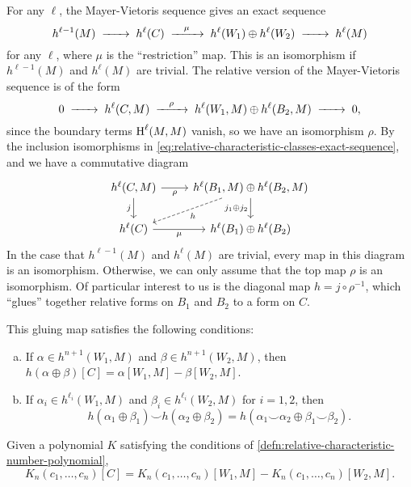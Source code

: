For any $\ell$, the Mayer-Vietoris sequence gives an exact sequence
\[
	h^{\ell-1}(M)\lkxto h^{\ell}(C) \lkxto[\mu] h^{\ell}(W_1)\oplus h^{\ell}(W_2) \lkxto h^{\ell}(M)
\]
for any $\ell$, where $\mu$ is the ``restriction'' map. This is an isomorphism if $h^{\ell-1}(M)$ and $h^\ell(M)$ are trivial.
The relative version of the Mayer-Vietoris sequence is of the form
\[
	0 \lkxto h^{\ell}(C, M) \lkxto[\rho] h^{\ell}(W_1,M)\oplus h^{\ell}(B_2,M) \lkxto 0,
\]
since the boundary terms $\operatorname{H}^\ell(M,M)$ vanish, so we have an isomorphism $\rho$.
By the inclusion isomorphisms in \cref{eq:relative-characteristic-classes-exact-sequence}, and we have a commutative diagram
\[
	\begin{tikzcd}
		{h^{\ell}(C,M)} & {h^{\ell}(B_1,M)\oplus h^{\ell}(B_2,M)} \\
		{h^{\ell}(C)} & {h^{\ell}(B_1)\oplus h^{\ell}(B_2)}
		\arrow["j_1\oplus j_2"', from=1-2, to=2-2]
		\arrow["\rho"', from=1-1, to=1-2]
		\arrow["j"', from=1-1, to=2-1]
		\arrow["\mu"', from=2-1, to=2-2]
		\arrow["h", from=1-2, to=2-1, dashed]
	\end{tikzcd}
\]
In the case that $h^{\ell-1}(M)$ and $h^\ell(M)$ are trivial, every map in this diagram is an isomorphism. Otherwise, we can only assume that the top map $\rho$ is an isomorphism.
Of particular interest to us is the diagonal map $h = j\circ \rho^{-1}$, which ``glues'' together relative forms on $B_1$ and $B_2$ to a form on $C$.

\begin{proposition}\label{prop:invariant-variation-naturality}
	This gluing map satisfies the following conditions:
	\begin{enumerate}[(a)]
		\item If $\alpha\in h^{n+1}(W_1, M)$ and $\beta\in h^{n+1}(W_2,M)$, then
		      $h(\alpha\oplus \beta)[C] = \alpha[W_1, M] - \beta[W_2, M]$.
		\item If $\alpha_i\in h^{\ell_i}(W_1,M)$ and $\beta_i \in h^{\ell_i}(W_2,M)$ for $i=1,2$, then
		      \[h(\alpha_1\oplus\beta_1) \smile h(\alpha_2\oplus \beta_2) = h(\alpha_1\smile \alpha_2 \oplus \beta_1\smile \beta_2).\]
	\end{enumerate}
\end{proposition}

\begin{corollary}\label{prop:relative-characteristic-number-variation}
	Given a polynomial $K$ satisfying the conditions of \cref{defn:relative-characteristic-number-polynomial},
	\[
		K_n(c_1,\ldots, c_n)[C] = K_n(c_1,\ldots, c_n)[W_1, M] - K_n(c_1,\ldots, c_n)[W_2, M].
	\]
\end{corollary}

